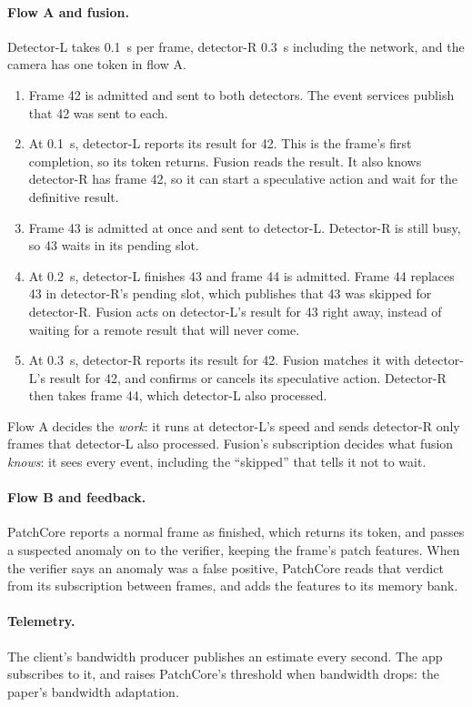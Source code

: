 \documentclass[11pt]{article}
\begin{document}
\paragraph{Flow A and fusion.} Detector-L takes 0.1~s per frame, detector-R
0.3~s including the network, and the camera has one token in flow A.
\begin{enumerate}[nosep]
  \item Frame 42 is admitted and sent to both detectors. The event services
        publish that 42 was sent to each.
  \item At 0.1~s, detector-L reports its result for 42. This is the frame's
        first completion, so its token returns. Fusion reads the result. It
        also knows detector-R has frame 42, so it can start a speculative
        action and wait for the definitive result.
  \item Frame 43 is admitted at once and sent to detector-L. Detector-R is
        still busy, so 43 waits in its pending slot.
  \item At 0.2~s, detector-L finishes 43 and frame 44 is admitted. Frame 44
        replaces 43 in detector-R's pending slot, which publishes that 43 was
        skipped for detector-R. Fusion acts on detector-L's result for 43 right
        away, instead of waiting for a remote result that will never come.
  \item At 0.3~s, detector-R reports its result for 42. Fusion matches it with
        detector-L's result for 42, and confirms or cancels its speculative
        action. Detector-R then takes frame 44, which detector-L also processed.
\end{enumerate}
Flow A decides the \emph{work}: it runs at detector-L's speed and sends
detector-R only frames that detector-L also processed. Fusion's subscription
decides what fusion \emph{knows}: it sees every event, including the ``skipped''
that tells it not to wait.

\paragraph{Flow B and feedback.} PatchCore reports a normal frame as finished,
which returns its token, and passes a suspected anomaly on to the verifier,
keeping the frame's patch features. When the verifier says an anomaly was a
false positive, PatchCore reads that verdict from its subscription between
frames, and adds the features to its memory bank.

\paragraph{Telemetry.} The client's bandwidth producer publishes an estimate
every second. The app subscribes to it, and raises PatchCore's threshold when
bandwidth drops: the paper's bandwidth adaptation.
\end{document}
